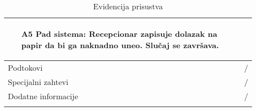 \documentclass[../main.tex]{subfiles}
\begin{document}
\begin{longtable}{| p{} | p{} |}
\begin{itemize}
        \item[A5] Pad sistema: Recepcionar zapisuje dolazak na papir da bi ga naknadno uneo. Slučaj se završava.
    \end{itemize}\\
\hline
    Podtokovi & /\\
\hline
    Specijalni zahtevi & /\\
\hline
    Dodatne informacije & /\\
\hline
\caption{Evidencija prisustva} %
\end{longtable}
 

\end{document}
